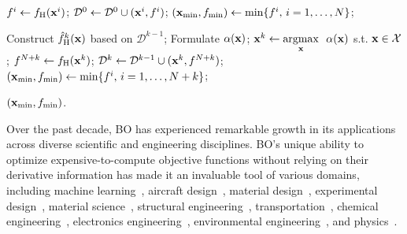 \documentclass[iicol,sn-basic]{sn-jnl}%
\theoremstyle{thmstyleone}%
\theoremstyle{thmstyletwo}
\theoremstyle{thmstylethree}
\begin{document}
\begin{linenumbers}
\begin{algorithm}
\begin{algorithmic}[1]
		\State $f^i \gets f_\text{H}({\bf x}^i)$; \textcolor{black}{}
		\State $\mathcal{D}^0 \gets \mathcal{D}^0 \cup ({\bf x}^i,f^i)$;
		\EndFor
		\State $({\bf x}_{\min},f_{\min}) \gets \min\{f^i,\, i=1,\dots, N\}$;
		
		\State Construct $\hat{f}_\text{H}^k({\bf x})$ based on $\mathcal{D}^{k-1}$;
		\State Formulate $\alpha({\bf x})$;
		\State ${\bf x}^{k} \gets \underset{{\bf x}}{\mathrm{argmax}} \ \ \alpha({\bf x})$ s.t. ${\bf x} \in \mathcal{X}$;
		\State $f^{N+k} \gets f_\text{H}({\bf x}^{k})$;
		\textcolor{black}{}
		\State $\mathcal{D}^k\gets\mathcal{D}^{k-1} \cup ({\bf x}^{k},f^{N+k})$;
		\State $({\bf x}_{\min},f_{\min}) \gets \min\{f^i,\, i=1,\dots, N+k\}$;
		\EndFor
		
		\State \Return $({\bf x}_{\min},f_{\min})$.
	\end{algorithmic}
\end{algorithm}

Over the past decade, BO has experienced remarkable growth in its applications across diverse scientific and engineering disciplines.
BO's unique ability to optimize expensive-to-compute objective functions without relying on their derivative information has made it an invaluable tool of various domains, including machine learning~\citep{Bergstra2011,Klein2017}, aircraft design~\citep{Priem2020,Jim2021}, material design~\citep{Frazier2015,Tran2019,YiZhang2020,Vangelatos2021,Khatamsaz2021b}, experimental design~\citep{Greenhill2020,Lei2021}, material science~\citep{Ueno2016,QLiang2021,Deshwal2021}, structural engineering~\citep{Mathern2021,Kuhn2022,Do2021,Do2022,Do2023}, transportation~\citep{RShi2021}, chemical engineering~\citep{Park2018,KWang2022}, electronics engineering~\citep{Torun2018}, environmental engineering~\citep{Manheim2019}, and  physics~\citep{Yamashita2018,Roussel2021}.


\end{linenumbers}
\end{document}

